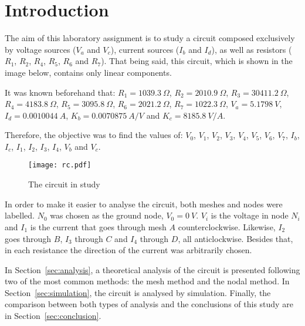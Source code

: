 \section{Introduction}
\label{sec:introduction}

\par
The aim of this laboratory assignment is to study a circuit composed exclusively by voltage sources ($V_a$ and $V_c$), current sources ($I_b$ and $I_d$), as well as resistors ($R_1$, $R_2$, $R_4$, $R_5$, $R_6$ and $R_7$). That being said, this circuit, which is shown in the image below, contains only linear components.

\par
It was known beforehand that:
$R_1 = 1039.3 \ \Omega$,
$R_2 = 2010.9 \ \Omega$,
$R_3 = 30411.2 \ \Omega$,
$R_4 = 4183.8 \ \Omega$,
$R_5 = 3095.8 \ \Omega$,
$R_6 = 2021.2 \ \Omega$,
$R_7 = 1022.3 \ \Omega$,
$V_a = 5.1798 \ V$,
$I_d = 0.0010044 \ A$,
$K_b = 0.0070875 \ A/V$ and
$K_c = 8185.8 \ V/A$.

\par
Therefore, the objective was to find the values of: $V_0$, $V_1$, $V_2$, $V_3$, $V_4$, $V_5$, $V_6$, $V_7$, $I_b$, $I_c$, $I_1$, $I_2$, $I_3$, $I_4$, $V_b$ and $V_c$.

\begin{figure}[h] \centering
\texttt{[image: rc.pdf]}
\caption{The circuit in study}
\label{fig:rc}
\end{figure}

\par
In order to make it easier to analyse the circuit, both meshes and nodes were labelled. $N_0$ was chosen as the ground node, $V_0 = 0 \ V$. $V_i$ is the voltage in node $N_i$ and $I_1$ is the current that goes through mesh $A$ counterclockwise. Likewise, $I_2$ goes through $B$, $I_3$ through $C$ and $I_4$ through $D$, all anticlockwise. Besides that, in each resistance the direction of the current was arbitrarily chosen.

\par
In Section~\ref{sec:analysis}, a theoretical analysis of the circuit is presented following two of the most common methods: the mesh method and the nodal method. In Section~\ref{sec:simulation}, the circuit is analysed by simulation. Finally, the  comparison between both types of analysis and the conclusions of this study are in Section~\ref{sec:conclusion}.

